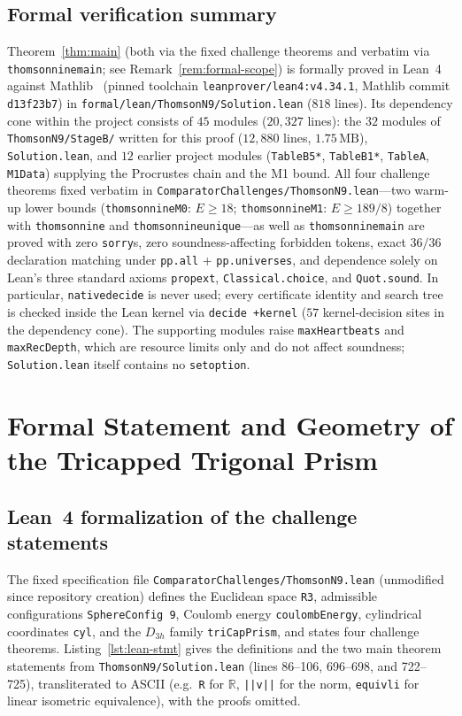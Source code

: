 \documentclass[11pt,reqno]{amsart}
\renewcommand{\_}{\origunderscore\allowbreak}
\theoremstyle{definition}
\newcommand{\R}{\mathbb{R}}
\begin{document}
\subsection{Formal verification summary}\label{subsec:formal-summary}
Theorem~\ref{thm:main} (both via the fixed challenge theorems and verbatim via \texttt{thomson\_nine\_main}; see Remark~\ref{rem:formal-scope}) is formally proved in Lean~4~\cite{deMouraUllrich2021} against Mathlib~\cite{Mathlib2020} (pinned toolchain \texttt{leanprover/lean4:v4.34.1}, Mathlib commit \texttt{d13f23b7}) in \texttt{formal/lean/ThomsonN9/Solution.lean} ($818$ lines). Its dependency cone within the project consists of $45$ modules ($20{,}327$ lines): the $32$ modules of \texttt{ThomsonN9/StageB/} written for this proof ($12{,}880$ lines, $1.75\,\mathrm{MB}$), \texttt{Solution.lean}, and $12$ earlier project modules (\texttt{TableB5*}, \texttt{TableB1*}, \texttt{TableA}, \texttt{M1Data}) supplying the Procrustes chain and the M1 bound.
All four challenge theorems fixed verbatim in \texttt{ComparatorChallenges/ThomsonN9.lean}---two warm-up lower bounds (\texttt{thomson\_nine\_M0}: $E \ge 18$; \texttt{thomson\_nine\_M1}: $E \ge 189/8$) together with \texttt{thomson\_nine} and \texttt{thomson\_nine\_unique}---as well as \texttt{thomson\_nine\_main} are proved with zero \texttt{sorry}s, zero soundness-affecting forbidden tokens, exact $36/36$ declaration matching under \texttt{pp.all} + \texttt{pp.universes}, and dependence solely on Lean's three standard axioms \texttt{propext}, \texttt{Classical.choice}, and \texttt{Quot.sound}.
In particular, \texttt{native\_decide} is never used; every certificate identity and search tree is checked inside the Lean kernel via \texttt{decide +kernel} ($57$ kernel-decision sites in the dependency cone). The supporting modules raise \texttt{maxHeartbeats} and \texttt{maxRecDepth}, which are resource limits only and do not affect soundness; \texttt{Solution.lean} itself contains no \texttt{set\_option}.

\section{Formal Statement and Geometry of the Tricapped Trigonal Prism}\label{sec:statement}

\subsection{Lean~4 formalization of the challenge statements}\label{subsec:lean-stmt}
The fixed specification file \texttt{ComparatorChallenges/ThomsonN9.lean} (unmodified since repository creation) defines the Euclidean space \texttt{R3}, admissible configurations \texttt{SphereConfig 9}, Coulomb energy \texttt{coulombEnergy}, cylindrical coordinates \texttt{cyl}, and the $D_{3h}$ family \texttt{triCapPrism}, and states four challenge theorems.
Listing~\ref{lst:lean-stmt} gives the definitions and the two main theorem statements from \texttt{ThomsonN9/Solution.lean} (lines 86--106, 696--698, and 722--725), transliterated to ASCII (e.g.\ \texttt{R} for $\R$, \texttt{||v||} for the norm, \texttt{equiv\_li} for linear isometric equivalence), with the proofs omitted.
\end{document}
